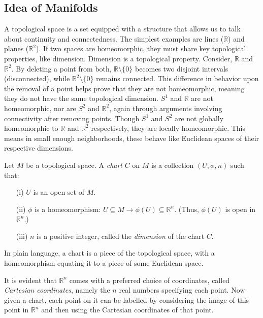 \documentclass{article}
\begin{document}
\subsection{Idea of Manifolds}

A topological space is a set equipped with a structure that allows us to talk about continuity and connectedness. The simplest examples are lines (\(\mathbb{R}\)) and planes (\(\mathbb{R}^2\)). If two spaces are homeomorphic, they must share key topological properties, like dimension. Dimension is a topological property. Consider, \(\mathbb{R}\) and \(\mathbb{R}^2\). By deleting a point from both, \(\mathbb{R} \setminus \{0\}\) becomes two disjoint intervals (disconnected), while \(\mathbb{R}^2 \setminus \{0\}\) remains connected. This difference in behavior upon the removal of a point helps prove that they are not homeomorphic, meaning they do not have the same topological dimension. \(S^1\) and \(\mathbb{R}\) are not homeomorphic, nor are \(S^2\) and \(\mathbb{R}^2\), again through arguments involving connectivity after removing points. Though \(S^1\) and \(S^2\) are not globally homeomorphic to \(\mathbb{R}\) and \(\mathbb{R}^2\) respectively, they are locally homeomorphic. This means in small enough neighborhoods, these behave like Euclidean spaces of their respective dimensions. 

\begin{theorem}
Let \( M \) be a topological space. A \textit{chart} \( C \) on \( M \) is a collection \( (U, \phi, n) \) such that:
\begin{enumerate}
    \item[(i)] \( U \) is an open set of \( M \).
    \item[(ii)] \( \phi \) is a homeomorphism: \( U \subseteq M \rightarrow \phi(U) \subseteq \mathbb{R}^n \). (Thus, \( \phi(U) \) is open in \( \mathbb{R}^n \).)
    \item[(iii)] \( n \) is a positive integer, called the \textit{dimension} of the chart \( C \).
\end{enumerate} 

\end{theorem}
In plain language, a chart is a piece of the topological space, with a homeomorphism equating it to a piece of some Euclidean space. 

It is evident that \( \mathbb{R}^n \) comes with a preferred choice of coordinates, called \textit{Cartesian coordinates}, namely the \( n \) real numbers specifying each point. Now given a chart, each point on it can be labelled by considering the image of this point in \( \mathbb{R}^n \) and then using the Cartesian coordinates of that point.
\end{document}
